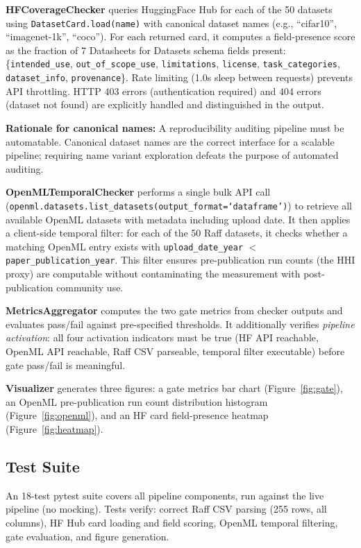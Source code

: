 \textbf{HFCoverageChecker} queries HuggingFace Hub for each of the 50 datasets using \texttt{DatasetCard.load(name)} with canonical dataset names (e.g., ``cifar10'', ``imagenet-1k'', ``coco''). For each returned card, it computes a field-presence score as the fraction of 7 Datasheets for Datasets schema fields present: \{\texttt{intended\_use}, \texttt{out\_of\_scope\_use}, \texttt{limitations}, \texttt{license}, \texttt{task\_categories}, \texttt{dataset\_info}, \texttt{provenance}\}. Rate limiting (1.0s sleep between requests) prevents API throttling. HTTP 403 errors (authentication required) and 404 errors (dataset not found) are explicitly handled and distinguished in the output.

\textbf{Rationale for canonical names:} A reproducibility auditing pipeline must be automatable. Canonical dataset names are the correct interface for a scalable pipeline; requiring name variant exploration defeats the purpose of automated auditing.

\textbf{OpenMLTemporalChecker} performs a single bulk API call (\texttt{openml.datasets.list\_datasets(output\_format=`dataframe')}) to retrieve all available OpenML datasets with metadata including upload date. It then applies a client-side temporal filter: for each of the 50 Raff datasets, it checks whether a matching OpenML entry exists with \texttt{upload\_date\_year} $<$ \texttt{paper\_publication\_year}. This filter ensures pre-publication run counts (the HHI proxy) are computable without contaminating the measurement with post-publication community use.

\textbf{MetricsAggregator} computes the two gate metrics from checker outputs and evaluates pass/fail against pre-specified thresholds. It additionally verifies \emph{pipeline activation}: all four activation indicators must be true (HF API reachable, OpenML API reachable, Raff CSV parseable, temporal filter executable) before gate pass/fail is meaningful.

\textbf{Visualizer} generates three figures: a gate metrics bar chart (Figure~\ref{fig:gate}), an OpenML pre-publication run count distribution histogram (Figure~\ref{fig:openml}), and an HF card field-presence heatmap (Figure~\ref{fig:heatmap}).

\subsection{Test Suite}

An 18-test pytest suite covers all pipeline components, run against the live pipeline (no mocking). Tests verify: correct Raff CSV parsing (255 rows, all columns), HF Hub card loading and field scoring, OpenML temporal filtering, gate evaluation, and figure generation.

